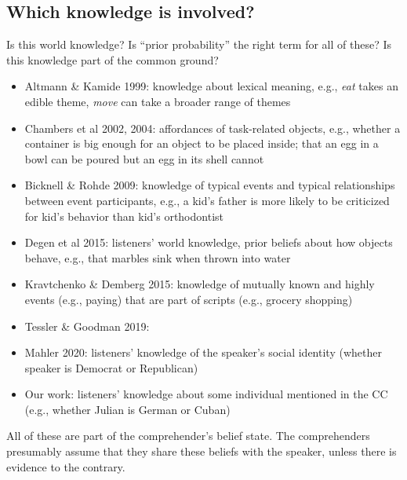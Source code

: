 \documentclass[11pt,fleqn]{article}
\newcommand{\6}{\mbox{$[\hspace*{-.6mm}[$}}
\newcommand{\9}{\mbox{$]\hspace*{-.6mm}]$}}
\begin{document}
\subsection{Which knowledge is involved?}

Is this world knowledge? Is ``prior probability'' the right term for all of these? Is this knowledge part of the common ground?

\begin{itemize}

\item Altmann \& Kamide 1999: knowledge about lexical meaning, e.g., {\em eat} takes an edible theme, {\em move} can take a broader range of themes

\item Chambers et al 2002, 2004: affordances of task-related objects, e.g., whether a container is big enough for an object to be placed inside; that an egg in a bowl can be poured but an egg in its shell cannot

\item Bicknell \& Rohde 2009: knowledge of typical events and typical relationships between event participants, e.g., a kid's father is more likely to be criticized for kid's behavior than kid's orthodontist

\item Degen et al 2015: listeners' world knowledge, prior beliefs about how objects behave, e.g., that marbles sink when thrown into water

\item Kravtchenko \& Demberg 2015: knowledge of mutually known and highly events (e.g., paying) that are part of scripts (e.g., grocery shopping)

\item Tessler \& Goodman 2019: 

\item Mahler 2020: listeners' knowledge of the speaker's social identity (whether speaker is Democrat or Republican)

\item Our work: listeners' knowledge about some individual mentioned in the CC (e.g., whether Julian is German or Cuban)

\end{itemize}

All of these are part of the comprehender's belief state. The comprehenders presumably assume that they share these beliefs with the speaker, unless there is evidence to the contrary. 
\end{document}
